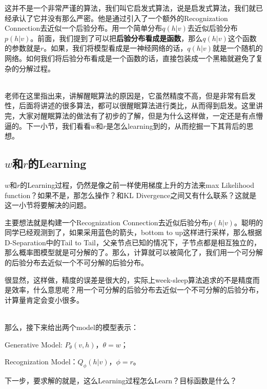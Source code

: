 \documentclass[a4paper]{article}
\begin{document}
这并不是一个非常严谨的算法，我们叫它启发式算法，说是启发式算法，我们就已经承认了它并没有那么严密。他是通过引入了一个额外的Recognization Connection去近似一个后验分布。用一个简单分布$q(h|v)$去近似后验分布$p(h|v)$。前面，我们提到了可以把\textbf{后验分布看成是函数}，那么$q(h|v)$这个函数的参数就是$r$。如果，我们将模型看成是一神经网络的话，$q(h|v)$就是一个随机的网络。如何我们将后验分布看成是一个函数的话，直接包装成一个黑箱就避免了复杂的分解过程。

~\\

老师在这里指出来，讲解醒眠算法的原因是，它虽然精度不高，但是非常有启发性，后面将讲述的很多算法，都可以很醒眠算法进行类比，从而得到启发。这里讲完，大家对醒眠算法的做法有了初步的了解，但是为什么这样做，一定还是有点懵逼的。下一小节，我们看看$w$和$r$是怎么learning到的，从而挖掘一下其背后的思想。

\subsection{$w$和$r$的Learning}
$w$和$r$的Learning过程，仍然是像之前一样使用梯度上升的方法来max Likelihood function？如果不是，那怎么操作？和KL Divergence之间又有什么联系？这就是这一小节将要解决的问题。

主要想法就是构建一个Recognization Connection去近似后验分布$p(h|v)$。聪明的同学已经观测到了，如果采用蓝色的箭头，bottom to up这样进行采样，那么根据D-Separation中的Tail to Tail，父亲节点已知的情况下，子节点都是相互独立的，那么概率图模型就是可分解的了。那么，计算就可以被简化了，我们用一个可分解的后验分布去近似一个不可分解的后验分布。

很显然，这样做，精度的误差是很大的，实际上week-sleep算法追求的不是精度而是效率，什么意思呢？用一个可分解的后验分布去近似一个不可分解的后验分布，计算量肯定会变小很多。

~\\

那么，接下来给出两个model的模型表示：

Generative Model: $P_\theta(v,h)$，$\theta = w$；

Recognization Model：$Q_\phi(h|v)$，$\phi = r$。

下一步，要求解的就是，这么Learning过程怎么Learn？目标函数是什么？
\end{document}
